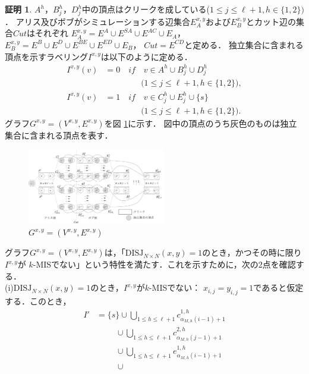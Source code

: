 \documentclass[11pt,a4paper]{jarticle}
\theoremstyle{definition}
\newtheorem*{prf*}{証明}
\begin{document}
\begin{prf*}
$A^{h}$，$B^{h}_{j}$，$D^{h}_{j}$中の頂点はクリークを成している($1\leq j \leq \ell+1, h \in \{1, 2\})$．
アリス及びボブがシミュレーションする辺集合$E^{x,y}_A$および$E^{x,y}_B$とカット辺の集合$\mathit{Cut}$はそれぞれ
$E^{x,y}_{A} = E^{A} \cup E^{SA} \cup E^{AC} \cup E_{A}$，
$E^{x,y}_{B} = E^{B} \cup E^{D} \cup E^{BE} \cup E^{ED} \cup E_{B}$，
$\mathit{Cut} = E^{CD}$と定める．
独立集合に含まれる頂点を示すラベリング$I^{x,y}$は以下のように定める．
\begin{align*}
I^{x,y}(v) &= 0 \quad if \quad v \in A^{h} \cup B^{h}_{j} \cup D^{h}_{j} \\
&\phantom{=} \quad \quad \quad \text{($1\leq j \leq \ell+1, h \in \{1, 2\}$)}, \\
I^{x,y}(v) &= 1 \quad if \quad v \in C^{h}_{j} \cup E^{h}_{j} \cup \{s\} \\
&\phantom{=} \quad \quad \quad \text{($1\leq j \leq \ell+1, h \in \{1, 2\}$)}.
\end{align*}
グラフ$G^{x, y} = (V^{x,y}, E^{x,y})$を図 \ref{k_G(x,y)}に示す．
図中の頂点のうち灰色のものは独立集合に含まれる頂点を表す．
\begin{figure}[ht]
\begin{center}
\includegraphics[width=60mm]{k_Gxy.png}
\end{center}
\caption{$G^{x, y} = (V^{x,y}, E^{x,y})$}
\label{k_G(x,y)}
\end{figure}
グラフ$G^{x, y} = (V^{x,y}, E^{x,y})$は，「$\mathrm{DISJ}_{N \times N} (x, y) = 1$のとき，かつその時に限り$I^{x,y}$が
$k$-MISでない」という特性を満たす．これを示すために，次の2点を確認する． \\
(i)$\mathrm{DISJ}_{N \times N} (x, y) = 1$のとき，$I^{x,y}$が$k$-MISでない：
$x_{i,j}=y_{i,j}=1$であると仮定する．このとき，
\begin{align*}
I' &= \{s\} \cup \bigcup_{1\leq h \leq \ell+1}c^{1,h}_{\alpha_{M,h}(i-1)+1} \\
&\phantom{=} \quad\cup 
\bigcup_{1\leq h \leq \ell+1}c^{2,h}_{\alpha_{M,h}(j-1)+1} \\
&\phantom{=} \quad \cup 
\bigcup_{1\leq h \leq \ell+1}e^{1,h}_{\alpha_{M,h}(i-1)+1} \\
&\phantom{=} \quad \cup 

\end{align*}
\end{prf*}
\end{document}
